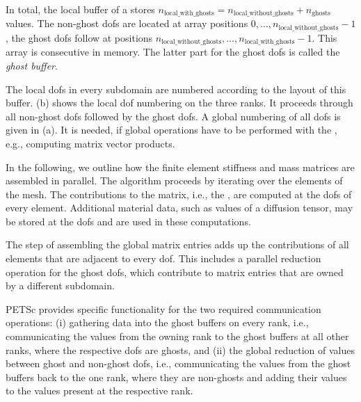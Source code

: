 In total, the local buffer of a \Vec{} stores $n_\text{local\_with\_ghosts} = n_\text{local\_without\_ghosts} + n_\text{ghosts}$ values. The non-ghost dofs are located at array positions $0,\dots,n_\text{local\_without\_ghosts}-1$, the ghost dofs follow at positions $n_\text{local\_without\_ghosts}, \dots, n_\text{local\_with\_ghosts}-1$. This array is consecutive in memory. The latter part for the ghost dofs is called the \emph{ghost buffer}. 

The local dofs in every subdomain are numbered according to the layout of this buffer.  (b) shows the local dof numbering on the three ranks. It proceeds through all non-ghost dofs followed by the ghost dofs. A global numbering of all dofs is given in  (a). It is needed, if global operations have to be performed with the \Vec{}, e.g., computing matrix vector products.

In the following, we outline how the finite element stiffness and mass matrices are assembled in parallel.
The algorithm proceeds by iterating over the elements of the mesh. The contributions to the matrix, i.e., the , are computed at the dofs of every element. 
Additional material data, such as values of a diffusion tensor, may be stored at the dofs and are used in these computations.

The step of assembling the global matrix entries adds up the contributions of all elements that are adjacent to every dof.
This includes a parallel reduction operation for the ghost dofs, which contribute to matrix entries that are owned by a different subdomain.

PETSc provides specific functionality for the two required communication operations: (i) gathering data into the ghost buffers on every rank, i.e., communicating the values from the owning rank to the ghost buffers at all other ranks, where the respective dofs are ghosts, and (ii) the global reduction of values between ghost and non-ghost dofs, i.e., communicating the values from the ghost buffers back to the one rank, where they are non-ghosts and adding their values to the values present at the respective rank.


